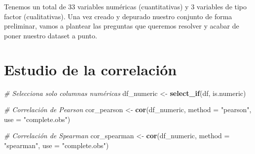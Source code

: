 \documentclass[notspecified,article,submit,moreauthors,pdftex]{Definitions/mdpi}
\newenvironment{Shaded}{\begin{snugshade}}{\end{snugshade}}
\newcommand{\AttributeTok}[1]{\textcolor[rgb]{0.13,0.29,0.53}{#1}}
\newcommand{\CommentTok}[1]{\textcolor[rgb]{0.56,0.35,0.01}{\textit{#1}}}
\newcommand{\FunctionTok}[1]{\textcolor[rgb]{0.13,0.29,0.53}{\textbf{#1}}}
\newcommand{\NormalTok}[1]{#1}
\newcommand{\OtherTok}[1]{\textcolor[rgb]{0.56,0.35,0.01}{#1}}
\newcommand{\StringTok}[1]{\textcolor[rgb]{0.31,0.60,0.02}{#1}}
\begin{document}
Tenemos un total de 33 variables numéricas (cuantitativas) y 3 variables
de tipo factor (cualitativas). Una vez creado y depurado nuestro
conjunto de forma preliminar, vamos a plantear las preguntas que
queremos resolver y acabar de poner nuestro dataset a punto.

\hypertarget{estudio-de-la-correlaciuxf3n}{%
\section{Estudio de la correlación}\label{estudio-de-la-correlaciuxf3n}}

\begin{Shaded}
\begin{Highlighting}[]
\CommentTok{\# Selecciona solo columnas numéricas}
\NormalTok{df\_numeric }\OtherTok{\textless{}{-}} \FunctionTok{select\_if}\NormalTok{(df, is.numeric)}

\CommentTok{\# Correlación de Pearson}
\NormalTok{cor\_pearson }\OtherTok{\textless{}{-}} \FunctionTok{cor}\NormalTok{(df\_numeric, }\AttributeTok{method =} \StringTok{"pearson"}\NormalTok{, }\AttributeTok{use =} \StringTok{"complete.obs"}\NormalTok{)}

\CommentTok{\# Correlación de Spearman}
\NormalTok{cor\_spearman }\OtherTok{\textless{}{-}} \FunctionTok{cor}\NormalTok{(df\_numeric, }\AttributeTok{method =} \StringTok{"spearman"}\NormalTok{, }\AttributeTok{use =} \StringTok{"complete.obs"}\NormalTok{)}
\end{Highlighting}
\end{Shaded}
\end{document}
